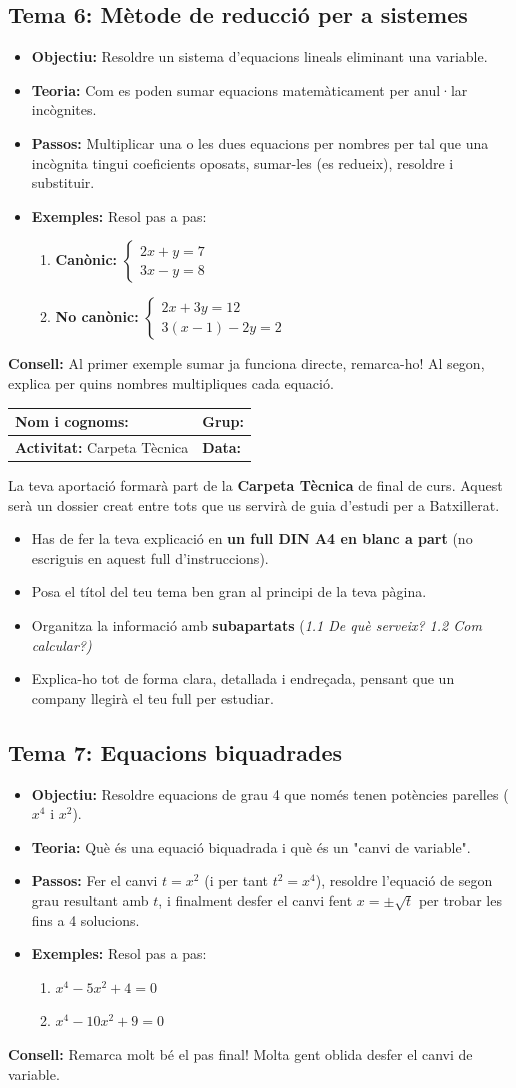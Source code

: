 \documentclass[12pt,a4paper]{article}
\newcommand{\introcomuna}{
    \begin{tcolorbox}[colback=gray!5,colframe=gray!50!black,title=\textbf{La Carpeta Tècnica de Matemàtiques}]
    La teva aportació formarà part de la \textbf{Carpeta Tècnica} de final de curs. Aquest serà un dossier creat entre tots que us servirà de guia d'estudi per a Batxillerat.
    
    \begin{itemize}[label=\textbullet, leftmargin=*]
        \item Has de fer la teva explicació en \textbf{un full DIN A4 en blanc a part} (no escriguis en aquest full d'instruccions).
        \item Posa el títol del teu tema ben gran al principi de la teva pàgina.
        \item Organitza la informació amb \textbf{subapartats} (\textit{1.1 De què serveix? 1.2 Com calcular?)}
        \item Explica-ho tot de forma clara, detallada i endreçada, pensant que un company llegirà el teu full per estudiar.
    \end{itemize}
    \end{tcolorbox}
    \vspace{0.1cm}
}
\newcommand{\capcaleraalumne}[1]{
    \begingroup
    \renewcommand{\arraystretch}{2.2}
    \begin{tabularx}{\textwidth}{|X|p{4cm}|}
    \hline
    \textbf{Nom i cognoms:} & \textbf{Grup:} \\ \hline
    \textbf{Activitat:} Carpeta Tècnica & \textbf{Data:} \\ \hline
    \end{tabularx}
    \endgroup
    \vspace{0.4cm}
}
\begin{document}
\subsection*{Tema 6: Mètode de reducció per a sistemes}
\begin{itemize}[label=\textbullet]
    \item \textbf{Objectiu:} Resoldre un sistema d'equacions lineals eliminant una variable.
    \item \textbf{Teoria:} Com es poden sumar equacions matemàticament per anul·lar incògnites.
    \item \textbf{Passos:} Multiplicar una o les dues equacions per nombres per tal que una incògnita tingui coeficients oposats, sumar-les (es redueix), resoldre i substituir.
    \item \textbf{Exemples:} Resol pas a pas:
    \begin{enumerate}[label=\alph*)]
        \item \textbf{Canònic:} $\begin{cases} 2x + y = 7 \\ 3x - y = 8 \end{cases}$
        \item \textbf{No canònic:} $\begin{cases} 2x + 3y = 12 \\ 3(x-1) - 2y = 2 \end{cases}$
    \end{enumerate}
\end{itemize}
\vfill
\noindent\textbf{Consell:} Al primer exemple sumar ja funciona directe, remarca-ho! Al segon, explica per quins nombres multipliques cada equació.

\newpage
\capcaleraalumne{7}
\introcomuna
\subsection*{Tema 7: Equacions biquadrades}
\begin{itemize}[label=\textbullet]
    \item \textbf{Objectiu:} Resoldre equacions de grau 4 que només tenen potències parelles ($x^4$ i $x^2$).
    \item \textbf{Teoria:} Què és una equació biquadrada i què és un "canvi de variable".
    \item \textbf{Passos:} Fer el canvi $t = x^2$ (i per tant $t^2 = x^4$), resoldre l'equació de segon grau resultant amb $t$, i finalment desfer el canvi fent $x = \pm\sqrt{t}$ per trobar les fins a 4 solucions.
    \item \textbf{Exemples:} Resol pas a pas:
    \begin{enumerate}[label=\alph*)]
        \item $x^4 - 5x^2 + 4 = 0$
        \item $x^4 - 10x^2 + 9 = 0$
    \end{enumerate}
\end{itemize}
\vfill
\noindent\textbf{Consell:} Remarca molt bé el pas final! Molta gent oblida desfer el canvi de variable.
\end{document}
